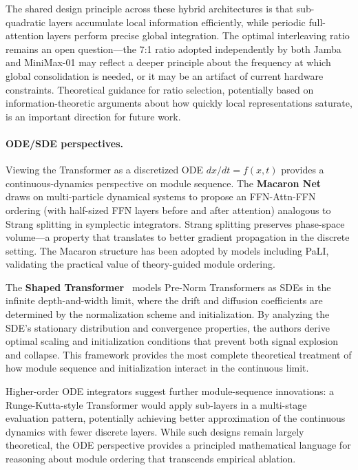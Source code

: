 The shared design principle across these hybrid architectures is that sub-quadratic layers accumulate local information efficiently, while periodic full-attention layers perform precise global integration. The optimal interleaving ratio remains an open question---the 7:1 ratio adopted independently by both Jamba and MiniMax-01 may reflect a deeper principle about the frequency at which global consolidation is needed, or it may be an artifact of current hardware constraints. Theoretical guidance for ratio selection, potentially based on information-theoretic arguments about how quickly local representations saturate, is an important direction for future work.

\paragraph{ODE/SDE perspectives.}
Viewing the Transformer as a discretized ODE $dx/dt = f(x,t)$ provides a continuous-dynamics perspective on module sequence. The \textbf{Macaron Net}~\cite{lu2019macaron} draws on multi-particle dynamical systems to propose an FFN-Attn-FFN ordering (with half-sized FFN layers before and after attention) analogous to Strang splitting in symplectic integrators. Strang splitting preserves phase-space volume---a property that translates to better gradient propagation in the discrete setting. The Macaron structure has been adopted by models including PaLI, validating the practical value of theory-guided module ordering.

The \textbf{Shaped Transformer}~\cite{noci2023shaped} models Pre-Norm Transformers as SDEs in the infinite depth-and-width limit, where the drift and diffusion coefficients are determined by the normalization scheme and initialization. By analyzing the SDE's stationary distribution and convergence properties, the authors derive optimal scaling and initialization conditions that prevent both signal explosion and collapse. This framework provides the most complete theoretical treatment of how module sequence and initialization interact in the continuous limit.

Higher-order ODE integrators suggest further module-sequence innovations: a Runge-Kutta-style Transformer would apply sub-layers in a multi-stage evaluation pattern, potentially achieving better approximation of the continuous dynamics with fewer discrete layers. While such designs remain largely theoretical, the ODE perspective provides a principled mathematical language for reasoning about module ordering that transcends empirical ablation.

